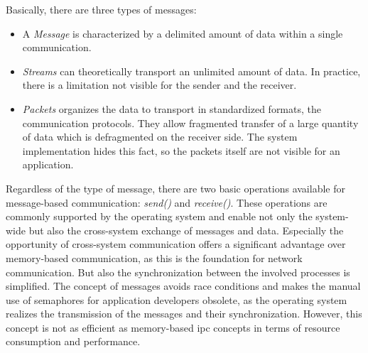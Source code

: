 Basically, there are three types of messages:
\begin{itemize}
    \item A \textit{Message} is characterized by a delimited amount of data within a single communication.
    \item \textit{Streams} can theoretically transport an unlimited amount of data. In practice, there is a limitation not visible for the sender and the receiver.
    \item \textit{Packets} organizes the data to transport in standardized formats, the communication protocols. They allow fragmented transfer of a large quantity of data which is defragmented on the receiver side. The system implementation hides this fact, so the packets itself are not visible for an application\cite{glatz2015betriebssysteme}. 
\end{itemize}


Regardless of the type of message, there are two basic operations available for message-based communication: \textit{send()} and \textit{receive()}.
These operations are commonly supported by the operating system and enable not only the system-wide but also the cross-system exchange of messages and data\cite{glatz2015betriebssysteme}.
Especially the opportunity of cross-system communication offers a significant advantage over memory-based communication, as this is the foundation for network communication.
But also the synchronization between the involved processes is simplified. 
The concept of messages avoids race conditions and makes the manual use of semaphores for application developers obsolete, as the operating system realizes the transmission of the messages and their synchronization.
However, this concept is not as efficient as memory-based \ac{ipc} concepts in terms of resource consumption and performance\cite{glatz2015betriebssysteme}.


